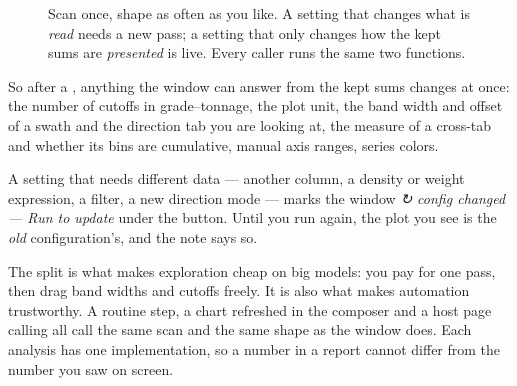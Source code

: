\begin{figure}[htbp]\centering
{}
\caption{Scan once, shape as often as you like. A setting that changes what is \emph{read} needs a new pass; a setting that only changes how the kept sums are \emph{presented} is live. Every caller runs the same two functions.}\label{fig:analysis-scan-shape}
\end{figure}

So after a , anything the window can answer from the kept sums changes at once: the number of cutoffs in grade–tonnage, the plot unit, the band width and offset of a swath and the direction tab you are looking at, the measure of a cross-tab and whether its bins are cumulative, manual axis ranges, series colors.

A setting that needs different data — another column, a density or weight expression, a filter, a new direction mode — marks the window \emph{↻ config changed — Run to update} under the button. Until you run again, the plot you see is the \emph{old} configuration's, and the note says so.

\begin{why}
The split is what makes exploration cheap on big models: you pay for one pass, then drag band widths and cutoffs freely. It is also what makes automation trustworthy. A routine step, a chart refreshed in the composer and a host page calling  all call the same scan and the same shape as the window does. Each analysis has one implementation, so a number in a report cannot differ from the number you saw on screen.
\end{why}

